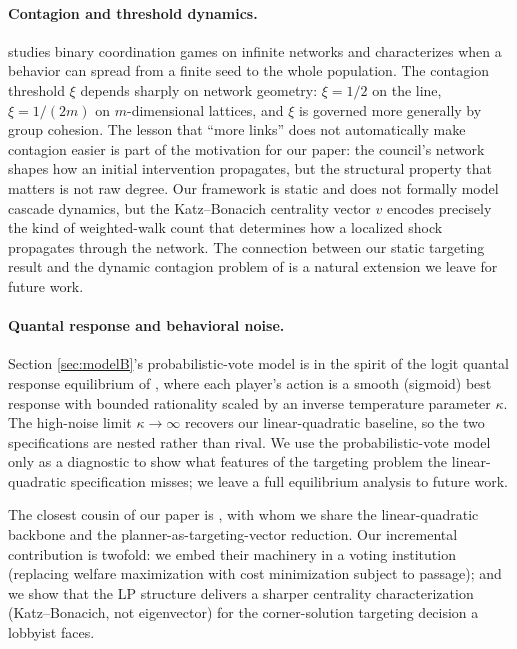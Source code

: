 \documentclass[11pt,letterpaper]{article}
\theoremstyle{plain}
\theoremstyle{definition}
\theoremstyle{remark}
\begin{document}
\paragraph{Contagion and threshold dynamics.} \citet{morris2000} studies binary coordination games on infinite networks and characterizes when a behavior can spread from a finite seed to the whole population. The contagion threshold $\xi$ depends sharply on network geometry: $\xi = 1/2$ on the line, $\xi = 1/(2m)$ on $m$-dimensional lattices, and $\xi$ is governed more generally by group cohesion. The lesson that ``more links'' does not automatically make contagion easier is part of the motivation for our paper: the council's network shapes how an initial intervention propagates, but the structural property that matters is not raw degree. Our framework is static and does not formally model cascade dynamics, but the Katz--Bonacich centrality vector $v$ encodes precisely the kind of weighted-walk count that determines how a localized shock propagates through the network. The connection between our static targeting result and the dynamic contagion problem of \citet{morris2000} is a natural extension we leave for future work.

\paragraph{Quantal response and behavioral noise.} Section \ref{sec:modelB}'s probabilistic-vote model is in the spirit of the logit quantal response equilibrium of \citet{mckelvey1995}, where each player's action is a smooth (sigmoid) best response with bounded rationality scaled by an inverse temperature parameter $\kappa$. The high-noise limit $\kappa \to \infty$ recovers our linear-quadratic baseline, so the two specifications are nested rather than rival. We use the probabilistic-vote model only as a diagnostic to show what features of the targeting problem the linear-quadratic specification misses; we leave a full equilibrium analysis to future work.

The closest cousin of our paper is \citet{ggg2020}, with whom we share the linear-quadratic backbone and the planner-as-targeting-vector reduction. Our incremental contribution is twofold: we embed their machinery in a voting institution (replacing welfare maximization with cost minimization subject to passage); and we show that the LP structure delivers a sharper centrality characterization (Katz--Bonacich, not eigenvector) for the corner-solution targeting decision a lobbyist faces.
\end{document}
